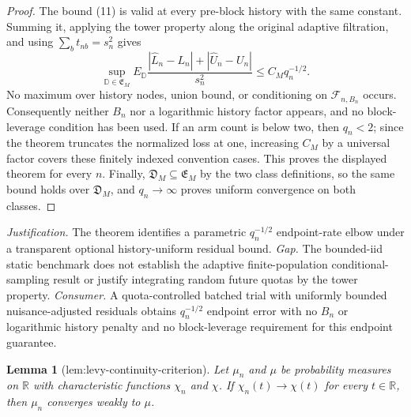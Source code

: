 \documentclass{article}
\newtheorem{lemma}{Lemma}
\begin{document}
\begin{proof}
The bound (11) is valid at every pre-block history with the same constant. Summing it, applying the tower property along the original adaptive filtration, and using \(\sum_bt_{nb}=s_n^2\) gives
\[
\sup_{\mathbb D\in\mathfrak E_M}
E_{\mathbb D}\frac{|\widehat L_n-L_n|+|\widehat U_n-U_n|}{s_n^2}
\le C_Mq_n^{-1/2}.
\tag{12}
\]
No maximum over history nodes, union bound, or conditioning on \(\mathcal F_{n,B_n}\) occurs. Consequently neither \(B_n\) nor a logarithmic history factor appears, and no block-leverage condition has been used. If an arm count is below two, then \(q_n<2\); since the theorem truncates the normalized loss at one, increasing \(C_M\) by a universal factor covers these finitely indexed convention cases. This proves the displayed theorem for every \(n\). Finally, \(\mathfrak D_M\subseteq\mathfrak E_M\) by the two class definitions, so the same bound holds over \(\mathfrak D_M\), and \(q_n\to\infty\) proves uniform convergence on both classes.
\end{proof}
\par\smallskip\noindent \textit{Justification.} The theorem identifies a parametric \(q_n^{-1/2}\) endpoint-rate elbow under a transparent optional history-uniform residual bound. \textit{Gap.} The bounded-iid static benchmark does not establish the adaptive finite-population conditional-sampling result or justify integrating random future quotas by the tower property. \textit{Consumer.} A quota-controlled batched trial with uniformly bounded nuisance-adjusted residuals obtains \(q_n^{-1/2}\) endpoint error with no \(B_n\) or logarithmic history penalty and no block-leverage requirement for this endpoint guarantee.

\begin{lemma}[lem:levy-continuity-criterion]\label{lem:levy-continuity-criterion}
Let \(\mu_n\) and \(\mu\) be probability measures on \(\mathbb R\) with characteristic functions \(\chi_n\) and \(\chi\). If \(\chi_n(t)\to\chi(t)\) for every \(t\in\mathbb R\), then \(\mu_n\) converges weakly to \(\mu\).
\end{lemma}
\end{document}
